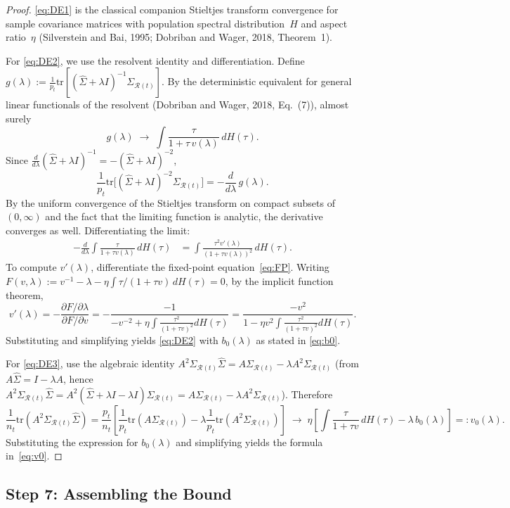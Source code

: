 \documentclass[11pt]{article}
\theoremstyle{definition}
\newcommand{\Rt}{\mathcal{R}(t)}
\newcommand{\SigR}{\Sigma_{\Rt}}
\newcommand{\hSig}{\widehat{\Sigma}}
\newcommand{\tr}{\mathrm{tr}}
\begin{document}
\begin{proof}
\eqref{eq:DE1} is the classical companion Stieltjes transform convergence
for sample covariance matrices with population spectral distribution~$H$
and aspect ratio~$\eta$ (Silverstein and Bai, 1995; Dobriban and Wager,
2018, Theorem~1).
 
For \eqref{eq:DE2}, we use the resolvent identity and differentiation.
Define $g(\lambda):=\frac{1}{p_t}\tr[(\hSig+\lambda I)^{-1}\SigR]$.
By the deterministic equivalent for general linear functionals of the
resolvent (Dobriban and Wager, 2018, Eq.~(7)), almost surely
\[
  g(\lambda)
  \;\longrightarrow\;
  \int\frac{\tau}{1+\tau\,v(\lambda)}\,dH(\tau).
\]
Since $\frac{d}{d\lambda}(\hSig+\lambda I)^{-1}
=-(\hSig+\lambda I)^{-2}$,
\[
  \frac{1}{p_t}\tr\bigl[(\hSig+\lambda I)^{-2}\SigR\bigr]
  =-\frac{d}{d\lambda}\,g(\lambda).
\]
By the uniform convergence of the Stieltjes transform on compact subsets
of $(0,\infty)$ and the fact that the limiting function is analytic,
the derivative converges as well.  Differentiating the limit:
\begin{align*}
  -\frac{d}{d\lambda}\int\frac{\tau}{1+\tau v(\lambda)}\,dH(\tau)
  &=\int\frac{\tau^2 v'(\lambda)}{(1+\tau v(\lambda))^2}\,dH(\tau).
\end{align*}
To compute $v'(\lambda)$, differentiate the fixed-point
equation~\eqref{eq:FP}.  Writing
$F(v,\lambda):=v^{-1}-\lambda
-\eta\int\tau/(1+\tau v)\,dH(\tau)=0$,
by the implicit function theorem,
\[
  v'(\lambda)
  =-\frac{\partial F/\partial\lambda}
         {\partial F/\partial v}
  =-\frac{-1}{-v^{-2}+\eta\int\frac{\tau^2}{(1+\tau v)^2}dH(\tau)}
  =\frac{-v^2}{1-\eta v^2\int\frac{\tau^2}{(1+\tau v)^2}dH(\tau)}.
\]
Substituting and simplifying yields
\eqref{eq:DE2} with $b_0(\lambda)$ as stated in \eqref{eq:b0}.
 
For \eqref{eq:DE3}, use the algebraic identity
$A^2\SigR\hSig = A\SigR - \lambda A^2\SigR$
(from $A\hSig = I - \lambda A$, hence
$A^2\SigR\hSig = A^2(\hSig+\lambda I-\lambda I)\SigR
= A\SigR - \lambda A^2\SigR$).  Therefore
\[
  \frac{1}{n_t}\tr(A^2\SigR\hSig)
  =\frac{p_t}{n_t}\left[
    \frac{1}{p_t}\tr(A\SigR)
    -\lambda\frac{1}{p_t}\tr(A^2\SigR)
  \right]
  \;\longrightarrow\;
  \eta\!\left[
    \int\frac{\tau}{1+\tau v}\,dH(\tau)
    -\lambda\,b_0(\lambda)
  \right]
  =:v_0(\lambda).
\]
Substituting the expression for $b_0(\lambda)$ and simplifying yields
the formula in~\eqref{eq:v0}.
\end{proof}
 
\subsection{Step 7: Assembling the Bound}\label{sec:step7}
 
\end{document}
